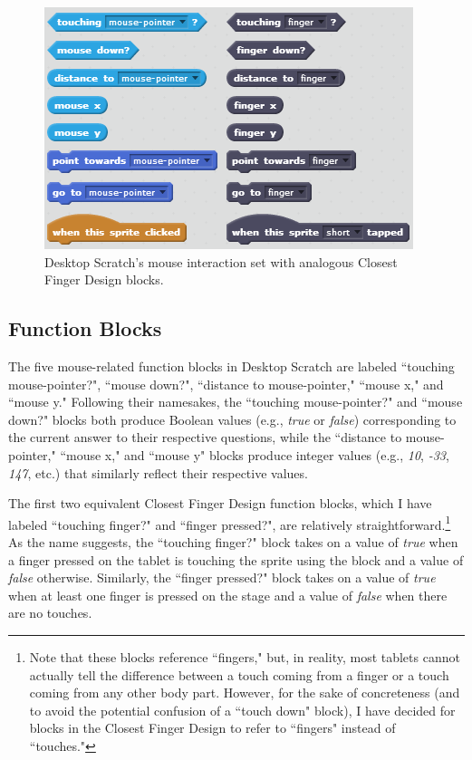 \begin{figure}
\centering
\includegraphics{images/Closest_Finger_Design_Block_Set.PNG}
\caption[The Closest Finger Design Interaction Set]{Desktop Scratch's mouse interaction set with analogous Closest Finger Design blocks.}
\label{Closest_Finger_Design_Block_Set}
\end{figure}

\subsection{Function Blocks}
The five mouse-related function blocks in Desktop Scratch are labeled ``touching mouse-pointer?", ``mouse down?", ``distance to mouse-pointer," ``mouse x," and ``mouse y." Following their namesakes, the ``touching mouse-pointer?" and ``mouse down?" blocks both produce Boolean values (e.g., \emph{true} or \emph{false}) corresponding to the current answer to their respective questions, while the ``distance to mouse-pointer," ``mouse x," and ``mouse y" blocks produce integer values (e.g., \emph{10}, \emph{-33}, \emph{147}, etc.) that similarly reflect their respective values. 

The first two equivalent Closest Finger Design function blocks, which I have labeled ``touching finger?" and ``finger pressed?", are relatively straightforward.\footnote{Note that these blocks reference ``fingers," but, in reality, most tablets cannot actually tell the difference between a touch coming from a finger or a touch coming from any other body part. However, for the sake of concreteness (and to avoid the potential confusion of a ``touch down" block), I have decided for blocks in the Closest Finger Design to refer to ``fingers" instead of ``touches."}
As the name suggests, the ``touching finger?" block takes on a value of \emph{true} when a finger pressed on the tablet is touching the sprite using the block and a value of \emph{false} otherwise. Similarly, the ``finger pressed?" block takes on a value of \emph{true} when at least one finger is pressed on the stage and a value of \emph{false} when there are no touches.

